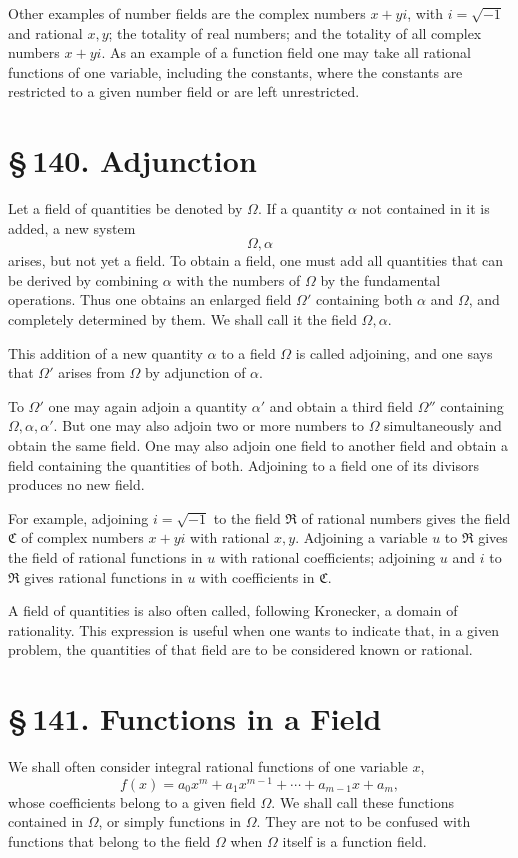 \documentclass[11pt]{article}
\providecommand{\sect}[2]{\section*{\S\,#1. #2}}
\begin{document}
Other examples of number fields are the complex numbers $x+yi$, with $i=\sqrt{-1}$ and rational $x,y$; the totality of real numbers; and the totality of all complex numbers $x+yi$. As an example of a function field one may take all rational functions of one variable, including the constants, where the constants are restricted to a given number field or are left unrestricted.

\sect{140}{Adjunction}

Let a field of quantities be denoted by $\Omega$. If a quantity $\alpha$ not contained in it is added, a new system
\[
        \Omega,\alpha
\]
arises, but not yet a field. To obtain a field, one must add all quantities that can be derived by combining $\alpha$ with the numbers of $\Omega$ by the fundamental operations. Thus one obtains an enlarged field $\Omega'$ containing both $\alpha$ and $\Omega$, and completely determined by them. We shall call it the field $\Omega,\alpha$.

This addition of a new quantity $\alpha$ to a field $\Omega$ is called adjoining, and one says that $\Omega'$ arises from $\Omega$ by adjunction of $\alpha$.

To $\Omega'$ one may again adjoin a quantity $\alpha'$ and obtain a third field $\Omega''$ containing $\Omega,\alpha,\alpha'$. But one may also adjoin two or more numbers to $\Omega$ simultaneously and obtain the same field. One may also adjoin one field to another field and obtain a field containing the quantities of both. Adjoining to a field one of its divisors produces no new field.

For example, adjoining $i=\sqrt{-1}$ to the field $\mathfrak R$ of rational numbers gives the field $\mathfrak C$ of complex numbers $x+yi$ with rational $x,y$. Adjoining a variable $u$ to $\mathfrak R$ gives the field of rational functions in $u$ with rational coefficients; adjoining $u$ and $i$ to $\mathfrak R$ gives rational functions in $u$ with coefficients in $\mathfrak C$.

A field of quantities is also often called, following Kronecker, a domain of rationality. This expression is useful when one wants to indicate that, in a given problem, the quantities of that field are to be considered known or rational.

\sect{141}{Functions in a Field}

We shall often consider integral rational functions of one variable $x$,
\[
\tag{1}
        f(x)=a_0x^m+a_1x^{m-1}+\cdots+a_{m-1}x+a_m,
\]
whose coefficients belong to a given field $\Omega$. We shall call these functions contained in $\Omega$, or simply functions in $\Omega$. They are not to be confused with functions that belong to the field $\Omega$ when $\Omega$ itself is a function field.
\end{document}
